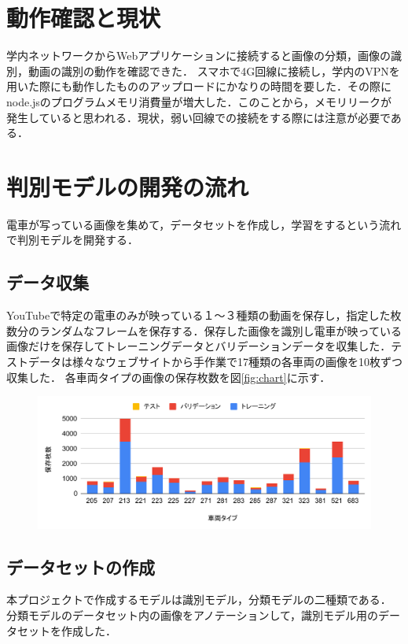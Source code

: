 \begin{multicols*}{2}
\section{動作確認と現状}
学内ネットワークからWebアプリケーションに接続すると画像の分類，画像の識別，動画の識別の動作を確認できた．
スマホで4G回線に接続し，学内のVPNを用いた際にも動作したもののアップロードにかなりの時間を要した．その際にnode.jsのプログラムメモリ消費量が増大した．このことから，メモリリークが発生していると思われる．現状，弱い回線での接続をする際には注意が必要である．

\section{判別モデルの開発の流れ}
電車が写っている画像を集めて，データセットを作成し，学習をするという流れで判別モデルを開発する．

\subsection{データ収集}
YouTubeで特定の電車のみが映っている１〜３種類の動画を保存し，指定した枚数分のランダムなフレームを保存する．保存した画像を識別し電車が映っている画像だけを保存してトレーニングデータとバリデーションデータを収集した．テストデータは様々なウェブサイトから手作業で17種類の各車両の画像を10枚ずつ収集した．
各車両タイプの画像の保存枚数を図\ref{fig:chart}に示す．
\begin{figure}
	\centering
	\includegraphics[width=\linewidth]{obj/chart2.pdf}
\end{figure}
\subsection{データセットの作成}
本プロジェクトで作成するモデルは識別モデル，分類モデルの二種類である．
分類モデルのデータセット内の画像をアノテーションして，識別モデル用のデータセットを作成した．



\end{multicols*}
